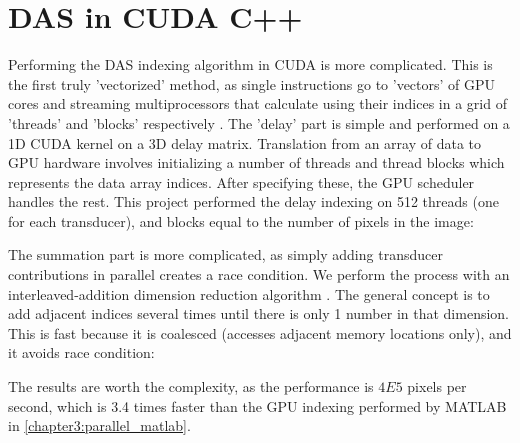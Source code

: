 
\section{DAS in CUDA C++}
\label{chapter3:CUDA_DAS}

    Performing the DAS indexing algorithm in CUDA is more complicated. This is the first truly 'vectorized' method, as single instructions go to 'vectors' of GPU cores and streaming multiprocessors that calculate using their indices in a grid of 'threads' and 'blocks' respectively \cite{CUDARefresherCUDA2020}. The 'delay' part is simple and performed on a 1D CUDA kernel on a 3D delay matrix. Translation from an array of data to GPU hardware involves initializing a number of threads and thread blocks which represents the data array indices. After specifying these, the GPU scheduler handles the rest. This project performed the delay indexing on 512 threads (one for each transducer), and blocks equal to the number of pixels in the image:

    

    The summation part is more complicated, as simply adding transducer contributions in parallel creates a race condition. We perform the process with an interleaved-addition dimension reduction algorithm \cite{harrisOptimizingParallelReduction}. The general concept is to add adjacent indices several times until there is only 1 number in that dimension. This is fast because it is coalesced (accesses adjacent memory locations only), and it avoids race condition:

    

    The results are worth the complexity, as the performance is $4E5$ pixels per second, which is 3.4 times faster than the GPU indexing performed by MATLAB in \ref{chapter3:parallel_matlab}.


